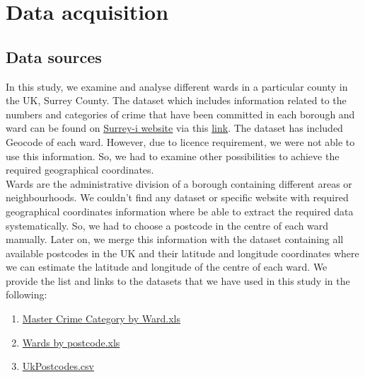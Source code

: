\documentclass[12pt]{article}
\begin{document}
\section{Data acquisition}
\subsection{Data sources}
In this study, we examine and analyse different wards in a particular county in the UK, Surrey County.  The dataset which includes information related to the numbers and categories of crime that have been committed in each borough and ward can be found on \href{https://www.surreyi.gov.uk/} {Surrey-i website} via this \href{https://www.surreyi.gov.uk/dataset?q=Master%20Crime%20Category%20by%20Ward%20}{link}. The dataset has included Geocode of each ward. However, due to licence requirement, we were not able to use this information. So, we had to examine other possibilities to achieve the required geographical coordinates.
\\\indent Wards are the administrative division of a borough containing different areas or neighbourhoods. We couldn't find any dataset or specific website with required geographical coordinates information where be able to extract the required data systematically. So, we had to choose a postcode in the centre of each ward manually.  Later on, we merge this information with the dataset containing all available postcodes in the UK and their latitude and longitude coordinates where we can estimate the latitude and longitude of the centre of each ward. 
We provide the list and links to the datasets that we have used in this study in the following:
\begin{enumerate}
  \item \href{https://www.surreyi.gov.uk/dataset?q=Master%20Crime%20Category%20by%20Ward%20}{Master Crime Category by Ward.xls}
  \item \href{https://github.com/SepidehN/Coursera_Capstone/blob/master/Wards_by_postcode.xls}{Wards by postcode.xls}
  \item \href{https://www.freemaptools.com/download-uk-postcode-lat-lng.htm}{UkPostcodes.csv} 
\end{enumerate}
\end{document}
